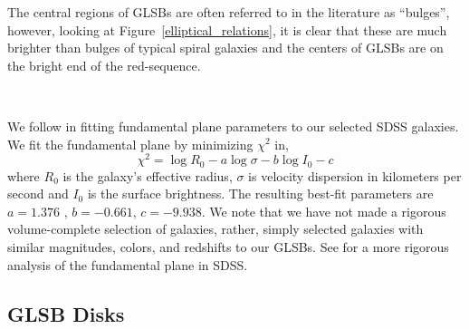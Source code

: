 \documentclass[12pt,preprint]{aastex}
\begin{document}
The central regions of GLSBs are often referred to in the literature as ``bulges'', however, looking at Figure~\ref{elliptical_relations}, it is clear that these are much brighter than bulges of typical spiral galaxies and the centers of GLSBs are on the bright end of the red-sequence.


\begin{figure*}
\\
\caption{
Top Left:  The color-magnitude diagram for 141,000 galaxies of similar redshift and magnitude as Malin~2 and UGC~6614.
Top Right:  The Faber-Jackson relation for 45,700 SDSS galaxies, along with a best-fit line.
Bottom Left:  The $r$-band fundamental plane from SDSS along with our GLSB galaxies and best-fit line. 
UGC~6614 is a slight outlier, but still within the 85\% contour.
Bottom Right:  The relation between central velocity dispersion and the Mg2 absorption feature.
Malin~1 is appears to be a metal-rich outlier. 
Contours are drawn which enclose 5\% to 85\% of the data with 20\% steps.
 From the point of view of the SDSS data reduction pipeline, GLSB galaxies appear as relatively red elliptical galaxies on the red-sequence.
\label{elliptical_relations}}
\end{figure*}

We follow \citet{Bernardi03,Bernardi03b} in fitting fundamental plane parameters to our selected SDSS galaxies.
We fit the fundamental plane by minimizing $\chi^2$ in, 
\begin{equation}
\chi^2 = \log R_0 - a \log \sigma - b \log I_0 - c
\end{equation}
where $R_0$ is the galaxy's effective radius, $\sigma$ is velocity dispersion in kilometers per second and $I_0$ is the surface brightness.
The resulting best-fit parameters are  $a =1.376$ , $b = -0.661$, $c = -9.938$.
We note that we have not made a rigorous volume-complete selection of galaxies, rather, simply selected galaxies with similar magnitudes, colors, and redshifts to our GLSBs.
 See \citet{Saulder13} for a more rigorous analysis of the fundamental plane in SDSS. 

\subsection{GLSB Disks}\label{sec:disks}
\end{document}
